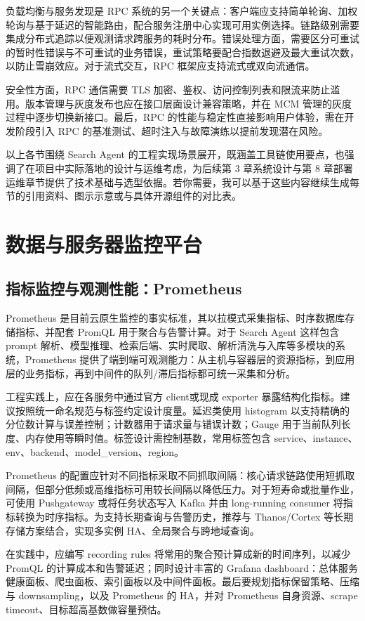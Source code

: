 负载均衡与服务发现是 RPC 系统的另一个关键点：客户端应支持简单轮询、加权轮询与基于延迟的智能路由，配合服务注册中心实现可用实例选择。链路级别需要集成分布式追踪以便观测请求跨服务的耗时分布。错误处理方面，需要区分可重试的暂时性错误与不可重试的业务错误，重试策略要配合指数退避及最大重试次数，以防止雪崩效应。对于流式交互，RPC 框架应支持流式或双向流通信。

安全性方面，RPC 通信需要 TLS 加密、鉴权、访问控制列表和限流来防止滥用。版本管理与灰度发布也应在接口层面设计兼容策略，并在 MCM 管理的灰度过程中逐步切换新接口。最后，RPC 的性能与稳定性直接影响用户体验，需在开发阶段引入 RPC 的基准测试、超时注入与故障演练以提前发现潜在风险。

以上各节围绕 Search Agent 的工程实现场景展开，既涵盖工具链使用要点，也强调了在项目中实际落地的设计与运维考虑，为后续第 3 章系统设计与第 8 章部署运维章节提供了技术基础与选型依据。若你需要，我可以基于这些内容继续生成每节的引用资料、图示示意或与具体开源组件的对比表。
\section{数据与服务器监控平台}
\subsection{指标监控与观测性能：Prometheus}
Prometheus\cite{Zhu2025PromSketch} 是目前云原生监控的事实标准，其以拉模式采集指标、时序数据库存储指标、并配套 PromQL 用于聚合与告警计算。对于 Search Agent 这样包含 prompt 解析、模型推理、检索后端、实时爬取、解析清洗与入库等多模块的系统，Prometheus 提供了端到端可观测能力：从主机与容器层的资源指标，到应用层的业务指标，再到中间件的队列/滞后指标都可统一采集和分析。

工程实践上，应在各服务中通过官方 client或现成 exporter 暴露结构化指标。建议按照统一命名规范与标签约定设计度量。延迟类使用 histogram 以支持精确的分位数计算与误差控制；计数器用于请求量与错误计数；Gauge 用于当前队列长度、内存使用等瞬时值。标签设计需控制基数，常用标签包含 service、instance、env、backend、model\_version、region。

Prometheus 的配置应针对不同指标采取不同抓取间隔：核心请求链路使用短抓取间隔，但部分低频或高维指标可用较长间隔以降低压力。对于短寿命或批量作业，可使用 Pushgateway 或将任务状态写入 Kafka 并由 long-running consumer 将指标转换为时序指标。为支持长期查询与告警历史，推荐与 Thanos/Cortex 等长期存储方案结合，实现多实例 HA、全局聚合与跨地域查询。

在实践中，应编写 recording rules 将常用的聚合预计算成新的时间序列，以减少 PromQL 的计算成本和告警延迟；同时设计丰富的 Grafana dashboard：总体服务健康面板、爬虫面板、索引面板以及中间件面板。最后要规划指标保留策略、压缩与 downsampling，以及 Prometheus 的 HA，并对 Prometheus 自身资源、scrape timeout、目标超高基数做容量预估。

